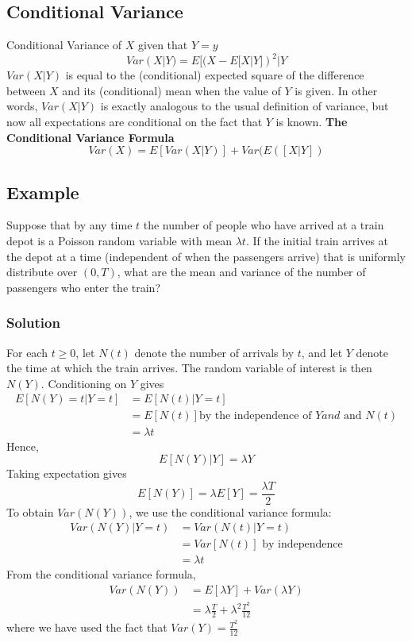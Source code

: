 \subsection{Conditional Variance}
Conditional Variance of $X$ given that $Y = y$ \[Var(X|Y) = E[(X - E[X|Y])^2|Y\] 
$Var(X|Y)$ is equal to the (conditional) expected square of the difference between $X$ and its (conditional) mean when the value of $Y$ is given. In other words, $Var(X|Y)$ is exactly analogous to the usual definition of variance, but now all
expectations are conditional on the fact that $Y$ is known.
\textbf{The Conditional Variance Formula}
\[Var(X) = E[Var(X|Y)] + Var(E([X|Y])\]
\subsection*{Example}
Suppose that by any time $t$ the number of people who have arrived at a train depot is a Poisson random variable with mean $\lambda t$. If the initial train arrives at the depot at a time (independent of when the passengers arrive) that is uniformly distribute over $(0,T)$, what are the mean and variance of the number of passengers who enter the train?
\subsubsection*{Solution}
For each $t\geq 0$, let $N(t)$ denote the number of arrivals by $t$, and let $Y$ denote the time at which the train arrives. The random variable of interest is then $N(Y)$. Conditioning on $Y$ gives \begin{equation*}
    \begin{split}
        E[N(Y) = t| Y = t] &= E[N(t)|Y=t]\\
        &= E[N(t)] \text{by the independence of } Y and \text{ and } N(t)\\
        &= \lambda t
    \end{split}
\end{equation*}
Hence, \[E[N(Y)|Y] = \lambda Y\] Taking expectation gives \[E[N(Y)] = \lambda E[Y] = \frac{\lambda T}{2}\]
To obtain $Var(N(Y))$, we use the conditional variance formula:
\begin{equation*}
    \begin{split}
        Var(N(Y)|Y = t) &= Var(N(t)|Y = t)\\
        &= Var[N(t)] \text{ by independence}\\
        &= \lambda t
    \end{split}
\end{equation*}
From the conditional variance formula, \begin{equation*}
    \begin{split}
        Var(N(Y)) &= E[\lambda Y] + Var(\lambda Y)\\
        &= \lambda \frac{T}{2} + \lambda^2 \frac{T^2}{12}
    \end{split}
\end{equation*}
where we have used the fact that $Var(Y) = \frac{T^2}{12}$
